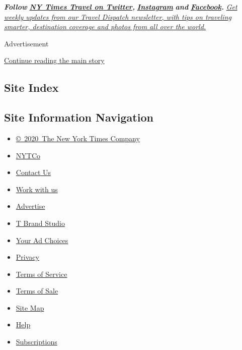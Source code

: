 \emph{\textbf{Follow}}
\textbf{\href{https://twitter.com/nytimestravel}{\emph{NY Times Travel
on Twitter}}\emph{,}}
\textbf{\href{https://www.instagram.com/nytimestravel/}{\emph{Instagram}}}
\emph{\textbf{and}}
\textbf{\href{https://www.facebookcorewwwi.onion/nytimestravel/}{\emph{Facebook}}\emph{.}}
\href{https://www.nytimes3xbfgragh.onion/newsletters/traveldispatch}{\emph{Get
weekly updates from our Travel Dispatch newsletter, with tips on
traveling smarter, destination coverage and photos from all over the
world.}}

Advertisement

\protect\hyperlink{after-bottom}{Continue reading the main story}

\hypertarget{site-index}{%
\subsection{Site Index}\label{site-index}}

\hypertarget{site-information-navigation}{%
\subsection{Site Information
Navigation}\label{site-information-navigation}}

\begin{itemize}
\tightlist
\item
  \href{https://help.nytimes3xbfgragh.onion/hc/en-us/articles/115014792127-Copyright-notice}{©~2020~The
  New York Times Company}
\end{itemize}

\begin{itemize}
\tightlist
\item
  \href{https://www.nytco.com/}{NYTCo}
\item
  \href{https://help.nytimes3xbfgragh.onion/hc/en-us/articles/115015385887-Contact-Us}{Contact
  Us}
\item
  \href{https://www.nytco.com/careers/}{Work with us}
\item
  \href{https://nytmediakit.com/}{Advertise}
\item
  \href{http://www.tbrandstudio.com/}{T Brand Studio}
\item
  \href{https://www.nytimes3xbfgragh.onion/privacy/cookie-policy\#how-do-i-manage-trackers}{Your
  Ad Choices}
\item
  \href{https://www.nytimes3xbfgragh.onion/privacy}{Privacy}
\item
  \href{https://help.nytimes3xbfgragh.onion/hc/en-us/articles/115014893428-Terms-of-service}{Terms
  of Service}
\item
  \href{https://help.nytimes3xbfgragh.onion/hc/en-us/articles/115014893968-Terms-of-sale}{Terms
  of Sale}
\item
  \href{https://spiderbites.nytimes3xbfgragh.onion}{Site Map}
\item
  \href{https://help.nytimes3xbfgragh.onion/hc/en-us}{Help}
\item
  \href{https://www.nytimes3xbfgragh.onion/subscription?campaignId=37WXW}{Subscriptions}
\end{itemize}
